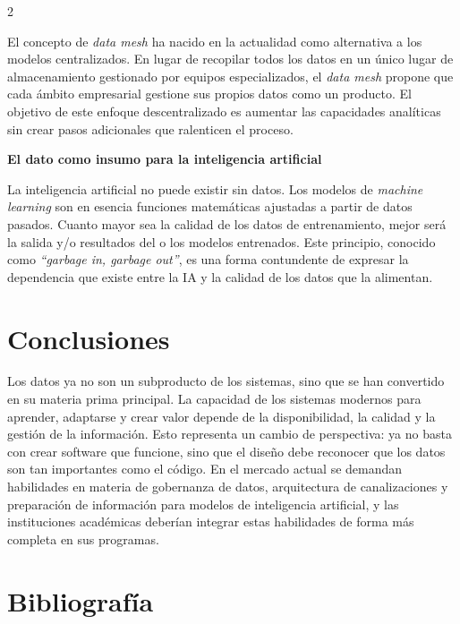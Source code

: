\documentclass[10pt,spanish,Letterpaper,openany]{book}
\let\origtextbf\textbf
\renewcommand{\textbf}[1]{{\color{textlinetitle}\origtextbf{#1}}}
\begin{document}
\begin {multicols}{2}

El concepto de \emph{data mesh} ha nacido en la actualidad como alternativa a los modelos centralizados. En lugar de recopilar todos los datos en un único lugar de almacenamiento gestionado por equipos especializados, el \emph{data mesh} propone que cada ámbito empresarial gestione sus propios datos como un producto. El objetivo de este enfoque descentralizado es aumentar las capacidades analíticas sin crear pasos adicionales que ralenticen el proceso.

\textbf{El dato como insumo para la inteligencia artificial}

La inteligencia artificial no puede existir sin datos. Los modelos de \emph{machine learning} son en esencia funciones matemáticas ajustadas a partir de datos pasados. Cuanto mayor sea la calidad de los datos de entrenamiento, mejor será la salida y/o resultados del o los modelos entrenados. Este principio, conocido como \emph{``garbage in, garbage out''}, es una forma contundente de expresar la dependencia que existe entre la IA y la calidad de los datos que la alimentan.

\section{Conclusiones}\label{conclusiones-7}

Los datos ya no son un subproducto de los sistemas, sino que se han convertido en su materia prima principal. La capacidad de los sistemas modernos para aprender, adaptarse y crear valor depende de la disponibilidad, la calidad y la gestión de la información. Esto representa un cambio de perspectiva: ya no basta con crear software que funcione, sino que el diseño debe reconocer que los datos son tan importantes como el código. En el mercado actual se demandan habilidades en materia de gobernanza de datos, arquitectura de canalizaciones y preparación de información para modelos de inteligencia artificial, y las instituciones académicas deberían integrar estas habilidades de forma más completa en sus programas.

\section{Bibliografía}\label{bibliografuxeda-12}


\end{multicols}
\end{document}
